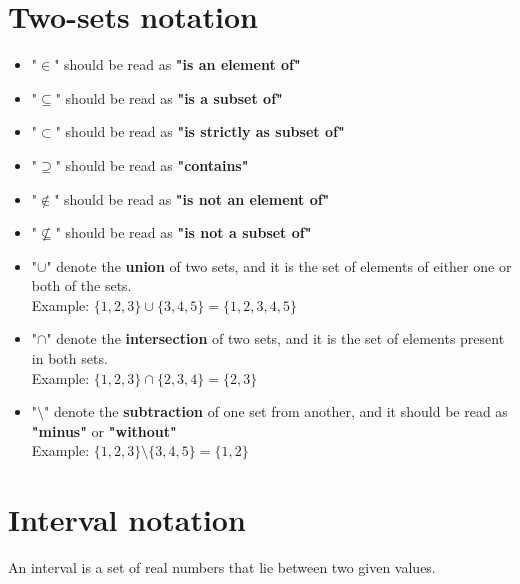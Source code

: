 \documentclass{article}
\begin{document}
\section{Two-sets notation}
\begin{itemize}
    \item "$\in$" should be read as \textbf{"is an element of"}
    \item "$\subseteq$" should be read as \textbf{"is a subset of"}
    \item "$\subset$" should be read as \textbf{"is strictly as subset of"}
    \item "$\supseteq$" should be read as \textbf{"contains"}
    \item "$\notin$" should be read as \textbf{"is not an element of"}
    \item "$\not\subseteq$" should be read as \textbf{"is not a subset of"}
    \item "$\cup$" denote the \textbf{union} of two sets, and it is the set of elements of either one or both of the sets. \\ Example: $\{1, 2, 3\}\cup\{3, 4, 5\} = \{1, 2, 3, 4, 5\}$
    \item "$\cap$" denote the \textbf{intersection} of two sets, and it is the set of elements present in both sets. \\ Example: $\{1, 2, 3\}\cap \{2, 3, 4\} = \{2, 3\}$
    \item "$\setminus$" denote the \textbf{subtraction} of one set from another, and it should be read as \textbf{"minus"} or \textbf{"without"} \\ Example: $\{1, 2, 3\}\setminus \{3, 4, 5\} = \{1, 2\}$
\end{itemize}

\section{Interval notation}

An interval is a set of real numbers that lie between two given values. \\

\begin{center}
\end{center}
\end{document}
